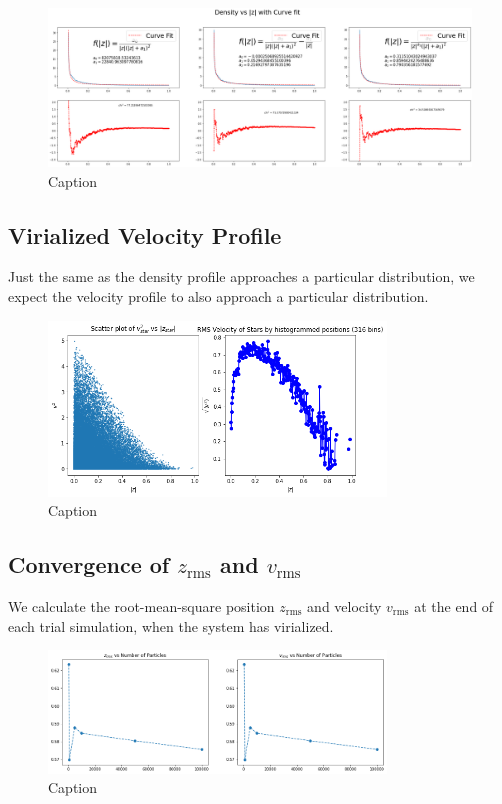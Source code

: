 \documentclass[oneside]{book}
\begin{document}
\begin{figure}[h]
    \centering
    \includegraphics[width = \textwidth]{Images/DensityCurveFit.png}
    \caption{Caption}
    \label{fig:my_label}
\end{figure}

\subsection{Virialized Velocity Profile}
Just the same as the density profile approaches a particular distribution, we expect the velocity profile to also approach a particular distribution.
\begin{figure}[h]
    \centering
    \includegraphics[width = 0.8\textwidth]{Images/VelocityDistribution.png}
    \caption{Caption}
    \label{fig:my_label}
\end{figure}


\subsection{Convergence of $z_\text{rms}$ and $v_\text{rms}$}
We calculate the root-mean-square position $z_\text{rms}$ and velocity $v_\text{rms}$ at the end of each trial simulation, when the system has virialized.
\begin{figure}[h]
    \centering
    \includegraphics[width=0.8\textwidth]{Images/RMS_Convergence.png}
    \caption{Caption}
    \label{fig:my_label}
\end{figure}
\end{document}
